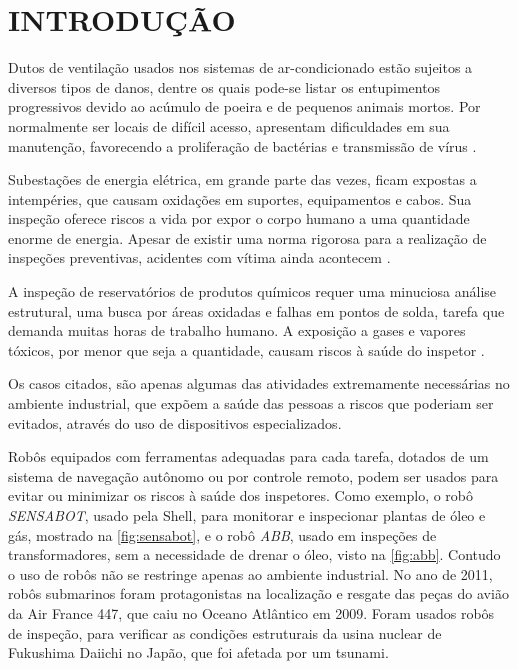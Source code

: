 
\chapter{INTRODUÇÃO}
\label{chap:introducao}

Dutos de ventilação usados nos sistemas de ar-condicionado estão sujeitos a diversos tipos de danos, dentre os quais pode-se listar os entupimentos progressivos devido ao acúmulo de poeira e de pequenos animais mortos.  Por normalmente ser locais de difícil acesso, apresentam dificuldades em sua manutenção, favorecendo a proliferação de bactérias e transmissão de vírus .\par
Subestações de energia elétrica, em grande parte das vezes, ficam expostas a intempéries, que causam oxidações em suportes, equipamentos e cabos. Sua inspeção oferece riscos a vida por expor o corpo humano a uma quantidade enorme de energia. Apesar de existir uma norma rigorosa para a realização de inspeções preventivas, acidentes com vítima ainda acontecem .\par
A inspeção de reservatórios de produtos químicos requer uma minuciosa análise estrutural, uma busca por áreas oxidadas e falhas em pontos de solda, tarefa que demanda muitas horas de trabalho humano. A exposição a gases e vapores tóxicos, por menor que seja a quantidade, causam riscos à saúde do inspetor .\par
Os casos citados, são apenas algumas das atividades extremamente necessárias no ambiente industrial, que expõem a saúde das pessoas a riscos que poderiam ser evitados, através do uso de dispositivos especializados. \par 
Robôs equipados com ferramentas adequadas para cada tarefa, dotados de um sistema de navegação autônomo ou por controle remoto, podem ser usados para evitar ou minimizar os riscos à saúde dos inspetores. Como exemplo, o robô \textit{SENSABOT}, usado pela Shell, para monitorar e inspecionar plantas de óleo e gás, mostrado na \autoref{fig:sensabot}, e o robô \textit{ABB}, usado em inspeções de transformadores, sem a necessidade de drenar o óleo, visto na \autoref{fig:abb}. Contudo o uso de robôs não se restringe apenas ao ambiente industrial. No ano de 2011, robôs submarinos foram protagonistas na localização e resgate das peças do avião da Air France 447, que caiu no Oceano Atlântico em 2009. Foram usados robôs de inspeção, para verificar as condições estruturais da usina nuclear de Fukushima Daiichi no Japão, que foi afetada por um tsunami. 

